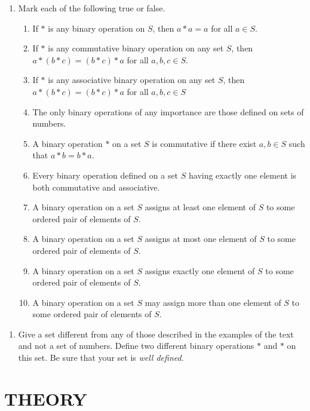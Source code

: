 \documentclass[10pt,letterpaper]{article}
\begin{document}
  \begin{enumerate}[resume]
    \item Mark each of the following true or false.
    \begin{enumerate}
      \item If $\ast$ is any binary operation on $S$, then $a\ast a = a$ for all $a \in S$.
      \item If $\ast$ is any commutative binary operation on any set $S$, then $a \ast (b \ast c) = (b \ast c) \ast a$ for all $a, b,c \in S$.
      \item If $\ast$ is any associative binary operation on any set $S$, then $a \ast (b \ast c)=(b \ast c) \ast a$ for all $a, b, c \in S$
      \item The only binary operations of any importance are those defined on sets of numbers.
      \item A binary operation $\ast$ on a set $S$ is  commutative if there exist $a, b \in S$ such that $a\ast b = b \ast a$.
      \item Every binary operation defined on a set $S$ having exactly one element is both commutative and associative.
      \item A binary operation on a set $S$ assigns at least one element of $S$ to some ordered pair of elements of $S$.
      \item A binary operation on a set $S$ assigns at most one element of $S$ to some ordered pair of elements of $S$.
      \item A binary operation on a set $S$ assigns exactly one element of $S$ to some ordered pair of elements of $S$.
      \item A binary operation on a set $S$ may assign more than one element of $S$ to some ordered pair of elements of $S$.
    \end{enumerate}
  \end{enumerate}

  \begin{enumerate}[resume]
    \item Give a set different from any of those described in the examples of the text and not a set of numbers. Define two different binary
    operations $\ast$ and $\ast$ on this set. Be sure that your set is \textit{well defined}.
  \end{enumerate}

  \section*{THEORY}
\end{document}
